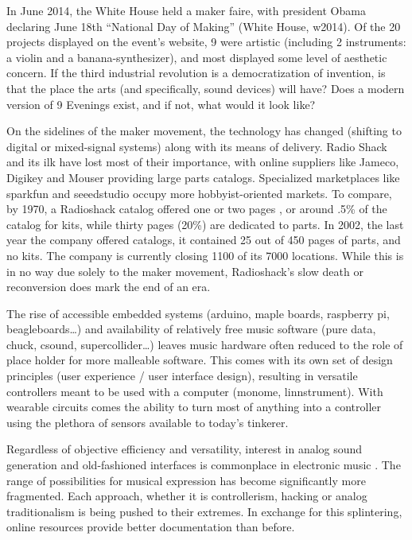 \begin{itemize}
In June 2014, the White House held a maker faire, with president Obama declaring June 18th “National Day of Making” (White House, w2014). Of the 20 projects displayed on the event’s website, 9 were artistic (including 2 instruments: a violin and a banana-synthesizer), and most displayed some level of aesthetic concern. If the third industrial revolution is a democratization of invention, is that the place the arts (and specifically, sound devices) will have? Does a modern version of 9 Evenings exist, and if not, what would it look like? 

On the sidelines of the maker movement, the technology has changed (shifting to digital or mixed-signal systems) along with its means of delivery. Radio Shack and its ilk have lost most of their importance, with online suppliers like Jameco, Digikey and Mouser providing large parts catalogs. Specialized marketplaces like sparkfun and seeedstudio occupy more hobbyist-oriented markets. To compare, by 1970, a Radioshack catalog offered one or two pages , or around .5\% of the catalog for kits, while thirty pages (20\%) are dedicated to parts. In 2002, the last year the company offered catalogs, it contained 25 out of 450 pages of parts, and no kits. The company is currently closing 1100 of its 7000 locations. While this is in no way due solely to the maker movement, Radioshack’s slow death or reconversion does mark the end of an era. 

The rise of accessible embedded systems (arduino, maple boards, raspberry pi, beagleboards…) and availability of relatively free music software (pure data, chuck, csound, supercollider…) leaves music hardware often reduced to the role of place holder for more malleable software. This comes with its own set of design principles (user experience / user interface design), resulting in versatile controllers meant to be used with a computer (monome, linnstrument). With wearable circuits comes the ability to turn most of anything into a controller using the plethora of sensors available to today’s tinkerer. 

Regardless of objective efficiency and versatility, interest in analog sound generation and old-fashioned interfaces is commonplace in electronic music \citep{collins2006}. The range of possibilities for musical expression has become significantly more fragmented. Each approach, whether it is controllerism, hacking or analog traditionalism is being pushed to their extremes. In exchange for this splintering, online resources provide better documentation than before.


\end{itemize}
